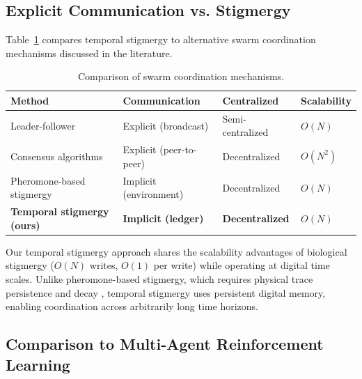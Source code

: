 \documentclass[12pt,a4paper,oneside]{report}
\begin{document}
\subsection{Explicit Communication vs. Stigmergy}
\label{subsec:explicit_communication_vs_stigmergy}

Table~\ref{tab:swarm_comparison_lit} compares temporal stigmergy to alternative swarm coordination mechanisms discussed in the literature.
\begin{table}[H]
\centering

\small

\setlength{\tabcolsep}{4pt}
\caption{Comparison of swarm coordination mechanisms.}
\label{tab:swarm_comparison_lit}
\begin{tabular}{>{\raggedright\arraybackslash}p{4.0cm} >{\raggedright\arraybackslash}p{4.0cm} >{\centering\arraybackslash}p{2.6cm} >{\centering\arraybackslash}p{2.6cm}}
\toprule

\textbf{Method} & \textbf{Communication} & \textbf{Centralized} & \textbf{Scalability} \\
\midrule

Leader-follower & Explicit (broadcast) & Semi-centralized & $O(N)$ \\

Consensus algorithms & Explicit (peer-to-peer) & Decentralized & $O(N^2)$ \\

Pheromone-based stigmergy & Implicit (environment) & Decentralized & $O(N)$ \\
\textbf{Temporal stigmergy (ours)} & \textbf{Implicit (ledger)} & \textbf{Decentralized} & \textbf{$O(N)$} \\
\bottomrule

\end{tabular}
\end{table}

Our temporal stigmergy approach shares the scalability advantages of biological stigmergy ($O(N)$ writes, $O(1)$ per write) while operating at digital time scales. Unlike pheromone-based stigmergy, which requires physical trace persistence and decay \cite{bongard2006resilient}, temporal stigmergy uses persistent digital memory, enabling coordination across arbitrarily long time horizons.
\subsection{Comparison to Multi-Agent Reinforcement Learning}
\label{subsec:comparison_to_multi_agent_reinforcement_learning}
\end{document}
